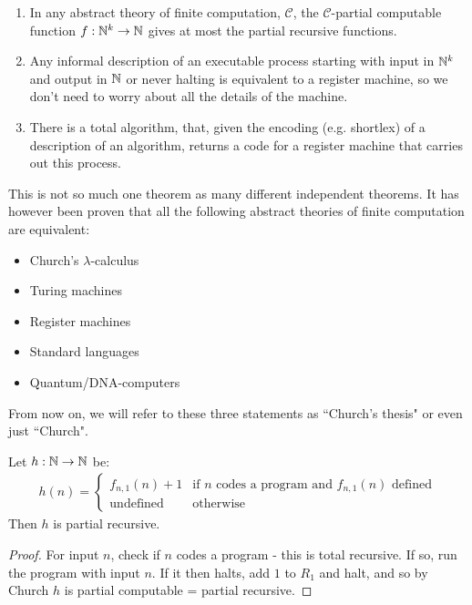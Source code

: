 \documentclass[10pt,a4paper]{article}
\begin{document}
\begin{theorem}\item
\begin{enumerate}
\item In any abstract theory of finite computation, $\mathscr{C}$, the $\mathscr{C}$-partial computable function $f:\mathbb{N}^k \to \mathbb{N}$ gives at most the partial recursive functions.
\item Any informal description of an executable process starting with input in $\mathbb{N}^k$ and output in $\mathbb{N}$ or never halting is equivalent to a register machine, so we don't need to worry about all the details of the machine.
\item There is a total algorithm, that, given the encoding (e.g. shortlex) of a description of an algorithm, returns a code for a register machine that carries out this process.
\end{enumerate}
\end{theorem}
This is not so much one theorem as many different independent theorems. It has however been proven that all the following abstract theories of finite computation are equivalent:
\begin{itemize}
\item Church's $\lambda$-calculus
\item Turing machines
\item Register machines
\item Standard languages
\item Quantum/DNA-computers
\end{itemize}
From now on, we will refer to these three statements as ``Church's thesis" or even just ``Church". 

\begin{lemma}
Let $h:\mathbb{N}\rightarrow \mathbb{N}$ be:
\begin{align*}
h(n) = \begin{cases}f_{n,1} (n) + 1 & \text{if $n$ codes a program and $f_{n,1}(n)$ defined} \\ \text{undefined} & \text{otherwise}\end{cases}
\end{align*}
Then $h$ is partial recursive.
\end{lemma}

\begin{proof}
For input $n$, check if $n$ codes a program - this is total recursive. If so, run the program with input $n$. If it then halts, add $1$ to $R_1$ and halt, and so by Church $h$ is partial computable = partial recursive.
\end{proof}
\end{document}
